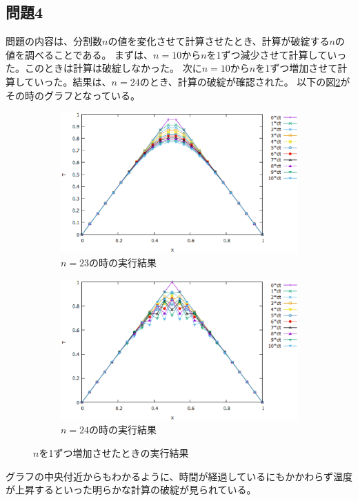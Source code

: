 \documentclass{jsarticle}
\begin{document}
\subsection{問題4}
問題の内容は、分割数$n$の値を変化させて計算させたとき、計算が破綻する$n$の値を調べることである。
まずは、$n=10$から$n$を1ずつ減少させて計算していった。このときは計算は破綻しなかった。
次に$n=10$から$n$を1ずつ増加させて計算していった。結果は、$n=24$のとき、計算の破綻が確認された。
以下の図\ref{fig08}がその時のグラフとなっている。
\begin{figure}[H]
	\centering
	\begin{subfigure}{0.9\columnwidth}
		\centering
		\includegraphics[width=\columnwidth]{pic07.eps}
		\caption{$n=23$の時の実行結果}
		\label{fig07}
	\end{subfigure}
	\begin{subfigure}{0.9\columnwidth}
		\centering
		\includegraphics[width=\columnwidth]{pic08.eps}
		\caption{$n=24$の時の実行結果}
		\label{fig08}
	\end{subfigure}
	\label{fignone02}
	\caption{$n$を1ずつ増加させたときの実行結果}
\end{figure}
グラフの中央付近からもわかるように、時間が経過しているにもかかわらず温度が上昇するといった明らかな計算の破綻が見られている。
\end{document}
